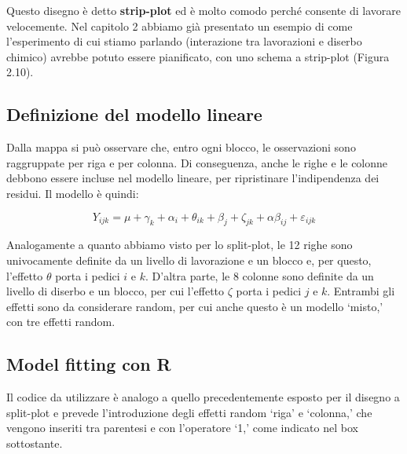 \documentclass[a4paper,12pt,oneside]{book}
\begin{document}
Questo disegno è detto \textbf{strip-plot} ed è molto comodo perché consente di lavorare velocemente. Nel capitolo 2 abbiamo già presentato un esempio di come l'esperimento di cui stiamo parlando (interazione tra lavorazioni e diserbo chimico) avrebbe potuto essere pianificato, con uno schema a strip-plot (Figura 2.10).

\hypertarget{definizione-del-modello-lineare-4}{%
\subsection{Definizione del modello lineare}\label{definizione-del-modello-lineare-4}}

Dalla mappa si può osservare che, entro ogni blocco, le osservazioni sono raggruppate per riga e per colonna. Di conseguenza, anche le righe e le colonne debbono essere incluse nel modello lineare, per ripristinare l'indipendenza dei residui. Il modello è quindi:

\[Y_{ijk} = \mu + \gamma_k + \alpha_i + \theta_{ik} + \beta_j + \zeta_{jk} + \alpha\beta_{ij} + \varepsilon_{ijk}\]

Analogamente a quanto abbiamo visto per lo split-plot, le 12 righe sono univocamente definite da un livello di lavorazione e un blocco e, per questo, l'effetto \(\theta\) porta i pedici \(i\) e \(k\). D'altra parte, le 8 colonne sono definite da un livello di diserbo e un blocco, per cui l'effetto \(\zeta\) porta i pedici \(j\) e \(k\). Entrambi gli effetti sono da considerare random, per cui anche questo è un modello `misto,' con tre effetti random.

\hypertarget{model-fitting-con-r-1}{%
\subsection{Model fitting con R}\label{model-fitting-con-r-1}}

Il codice da utilizzare è analogo a quello precedentemente esposto per il disegno a split-plot e prevede l'introduzione degli effetti random `riga' e `colonna,' che vengono inseriti tra parentesi e con l'operatore `1\textbar{},' come indicato nel box sottostante.
\end{document}

